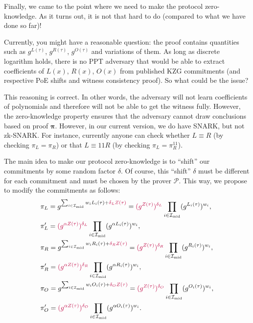 \documentclass[../lecture-notes-148x210.tex]{subfiles}
\begin{document}
Finally, we came to the point where we need to make the protocol zero-knowledge. As it turns out, it is not that hard to do (compared to what we have done so far)!

\begin{remark}
    Currently, you might have a reasonable question: the proof contains quantities such as $g^{L(\tau)}$, $g^{R(\tau)}$, $g^{O(\tau)}$ and variations of them. As long as discrete logarithm holds, there is no PPT adversary that would be able to extract coefficients of $L(x)$, $R(x)$, $O(x)$ from published KZG commitments (and respective PoE shifts and witness consistency proof). So what could be the issue?

    This reasoning is correct. In other words, the adversary will not learn coefficients of polynomials and therefore will not be able to get the witness fully. However, the zero-knowledge property ensures that the adversary cannot draw conclusions based on proof $\boldsymbol{\pi}$. However, in our current version, we do have SNARK, but not zk-SNARK. For instance, currently anyone can check whether $L \equiv R$ (by checking $\pi_L = \pi_R$) or that $L \equiv 11R$ (by checking $\pi_L = \pi_R^{11}$).  
\end{remark}

The main idea to make our protocol zero-knowledge is to ``shift'' our commitments by some random factor $\delta$. Of course, this ``shift'' $\delta$ must be different for each commitment and must be chosen by the prover $\mathcal{P}$. This way, we propose to modify the commitments as follows:
\begin{equation*}
    \begin{aligned}
        &\pi_L = g^{\sum_{i \in \mathcal{I}_{\text{mid}}}w_iL_i(\tau) + \textcolor{purple}{\delta_LZ(\tau)}} = \textcolor{purple}{(g^{Z(\tau)})^{\delta_L}}\prod_{i \in \mathcal{I}_{\text{mid}}}(g^{L_i(\tau)})^{w_i}, \\ & \pi_L' = \textcolor{purple}{(g^{\alpha Z(\tau)})^{\delta_L}}\prod_{i \in \mathcal{I}_{\text{mid}}}(g^{\alpha L_i(\tau)})^{w_i}, \\
        &\pi_R = g^{\sum_{i \in \mathcal{I}_{\text{mid}}}w_iR_i(\tau) + \textcolor{purple}{\delta_RZ(\tau)}} = \textcolor{purple}{(g^{Z(\tau)})^{\delta_R}}\prod_{i \in \mathcal{I}_{\text{mid}}}(g^{R_i(\tau)})^{w_i}, \\ & \pi_R' = \textcolor{purple}{(g^{\alpha Z(\tau)})^{\delta_R}}\prod_{i \in \mathcal{I}_{\text{mid}}}(g^{\alpha R_i(\tau)})^{w_i}, \\
        &\pi_O = g^{\sum_{i \in \mathcal{I}_{\text{mid}}}w_iO_i(\tau) + \textcolor{purple}{\delta_OZ(\tau)}} = \textcolor{purple}{(g^{Z(\tau)})^{\delta_O}}\prod_{i \in \mathcal{I}_{\text{mid}}}(g^{O_i(\tau)})^{w_i}, \\ & \pi_O' = \textcolor{purple}{(g^{\alpha Z(\tau)})^{\delta_O}}\prod_{i \in \mathcal{I}_{\text{mid}}}(g^{\alpha O_i(\tau)})^{w_i}.
    \end{aligned}
\end{equation*}
\end{document}
